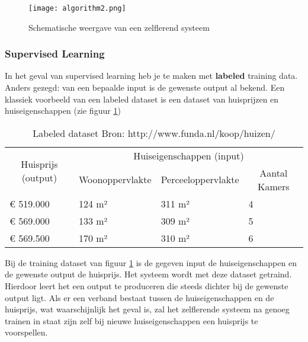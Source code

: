 \begin{figure}[h]
  \centering
    \texttt{[image: algorithm2.png]}
  \caption{Schematische weergave van een zelflerend systeem}
  \label{fig:algorithm2}
\end{figure}

\subsubsection{Supervised Learning}
In het geval van supervised learning heb je te maken met \textbf{labeled} training data. Anders gezegd: van een bepaalde input is de gewenste output al bekend. Een klassiek voorbeeld van een labeled dataset is een dataset van huisprijzen en huiseigenschappen (zie figuur \ref{fig:LabeledDataset})

\begin{table}[h]
\centering
\begin{tabular}{llll}
\hline
\multicolumn{1}{c}{\multirow{2}{*}{Huisprijs (output)}} & \multicolumn{3}{c}{Huiseigenschappen (input)} \\
\multicolumn{1}{c}{} & \multicolumn{1}{c}{Woonoppervlakte} & \multicolumn{1}{c}{Perceeloppervlakte} & \multicolumn{1}{c}{Aantal Kamers} \\ \hline
€ 519.000 & 124 m² & 311 m² & 4 \\
€ 569.000 & 133 m² & 309 m² & 5 \\
€ 569.500 & 170 m² & 310 m² & 6 \\ \hline
\end{tabular}
\caption{Labeled dataset Bron: http://www.funda.nl/koop/huizen/ }
\label{fig:LabeledDataset}
\end{table}
Bij de training dataset van figuur \ref{fig:LabeledDataset} is de gegeven input de huiseigenschappen en de gewenste output de huisprijs. Het systeem wordt met deze dataset getraind. Hierdoor leert het een output te produceren die steeds dichter bij de gewenste output ligt. Als er een verband bestaat tussen de huiseigenschappen en de huisprijs, wat waarschijnlijk het geval is, zal het zelflerende systeem na genoeg trainen in staat zijn zelf bij nieuwe huiseigenschappen een huisprijs te voorspellen. \cite{MLCourse1}


